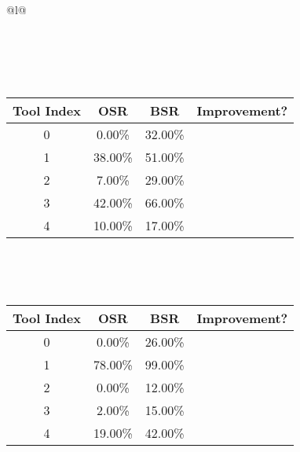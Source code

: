\begin{longtable}{@{}l@{}}
\begin{minipage}{\textwidth}
\begin{tabular}{|c|c|c|c|}
\end{tabular}
\end{minipage}\\[2ex]
\begin{minipage}{\textwidth}
\centering\vspace{2ex}
\\[0.8ex]
\begin{tabular}{|c|c|c|c|} \hline
\textbf{Tool Index} & \textbf{OSR} & \textbf{ BSR} & \textbf{Improvement?} \\ \hline
0 & 0.00\% & 32.00\% & \textcolor{green}{\ding{51}} \\ \hline
1 & 38.00\% & 51.00\% & \textcolor{green}{\ding{51}} \\ \hline
2 & 7.00\% & 29.00\% & \textcolor{green}{\ding{51}} \\ \hline
3 & 42.00\% & 66.00\% & \textcolor{green}{\ding{51}} \\ \hline
4 & 10.00\% & 17.00\% & \textcolor{green}{\ding{51}} \\ \hline
\end{tabular}
\end{minipage}\\[2ex]
\begin{minipage}{\textwidth}
\centering\vspace{2ex}
\\[0.8ex]
\begin{tabular}{|c|c|c|c|} \hline
\textbf{Tool Index} & \textbf{OSR} & \textbf{ BSR} & \textbf{Improvement?} \\ \hline
0 & 0.00\% & 26.00\% & \textcolor{green}{\ding{51}} \\ \hline
1 & 78.00\% & 99.00\% & \textcolor{green}{\ding{51}} \\ \hline
2 & 0.00\% & 12.00\% & \textcolor{green}{\ding{51}} \\ \hline
3 & 2.00\% & 15.00\% & \textcolor{green}{\ding{51}} \\ \hline
4 & 19.00\% & 42.00\% & \textcolor{green}{\ding{51}} \\ \hline
\end{tabular}
\end{minipage}\\[2ex]
\end{longtable}